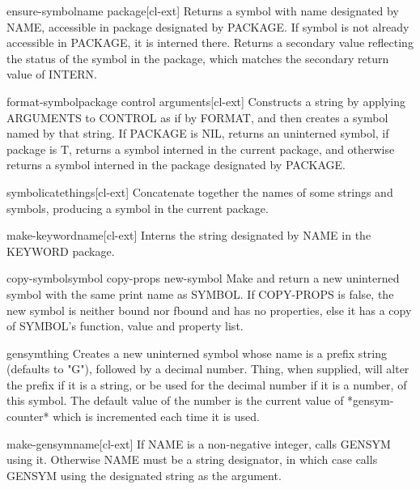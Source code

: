 \documentclass[10pt,english]{book}
\begin{document}
\begin{function}{ensure-symbol}{name \op package}[cl-ext]
  Returns a symbol with name designated by NAME, accessible in package
designated by PACKAGE. If symbol is not already accessible in PACKAGE, it is
interned there. Returns a secondary value reflecting the status of the symbol
in the package, which matches the secondary return value of INTERN.
\end{function}

\begin{function}{format-symbol}{package control \rest arguments}[cl-ext]
  Constructs a string by applying ARGUMENTS to CONTROL as if by FORMAT, and
then creates a symbol named by that string. If PACKAGE is NIL, returns an
uninterned symbol, if package is T, returns a symbol interned in the current
package, and otherwise returns a symbol interned in the package designated by
PACKAGE.
\end{function}

\begin{function}{symbolicate}{\rest things}[cl-ext]
  Concatenate together the names of some strings and symbols,
producing a symbol in the current package.
\end{function}

\begin{function}{make-keyword}{name}[cl-ext]
  Interns the string designated by NAME in the KEYWORD package.
\end{function}

\begin{function}{copy-symbol}{symbol \op copy-props \aux new-symbol}
  Make and return a new uninterned symbol with the same print name
  as SYMBOL. If COPY-PROPS is false, the new symbol is neither bound
  nor fbound and has no properties, else it has a copy of SYMBOL's
  function, value and property list.
\end{function}

\begin{function}{gensym}{\op thing}
  Creates a new uninterned symbol whose name is a prefix string (defaults
   to "G"), followed by a decimal number. Thing, when supplied, will
   alter the prefix if it is a string, or be used for the decimal number
   if it is a number, of this symbol. The default value of the number is
   the current value of *gensym-counter* which is incremented each time
   it is used.
\end{function}

\begin{function}{make-gensym}{name}[cl-ext]
  If NAME is a non-negative integer, calls GENSYM using it. Otherwise NAME
must be a string designator, in which case calls GENSYM using the designated
string as the argument.
\end{function}
\end{document}
